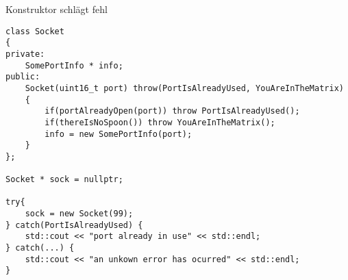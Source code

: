 \begin{frame}[fragile]{Konstruktor schlägt fehl}
	\begin{lstlisting}[]
class Socket
{
private:
	SomePortInfo * info;
public:
	Socket(uint16_t port) throw(PortIsAlreadyUsed, YouAreInTheMatrix)
	{
		if(portAlreadyOpen(port)) throw PortIsAlreadyUsed();
		if(thereIsNoSpoon()) throw YouAreInTheMatrix();
		info = new SomePortInfo(port);
	}
};

Socket * sock = nullptr;

try{
	sock = new Socket(99);
} catch(PortIsAlreadyUsed) {
	std::cout << "port already in use" << std::endl;
} catch(...) {
	std::cout << "an unkown error has ocurred" << std::endl;
}
	\end{lstlisting}

\end{frame}
